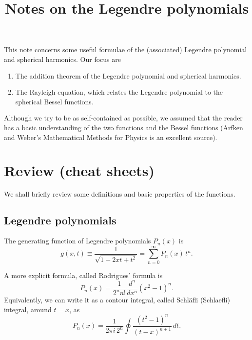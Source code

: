 \documentclass[11pt]{article}
\begin{document}
\title{Notes on the Legendre polynomials}
\author{ \vspace{-10ex} }
\date{ \vspace{-10ex} }
\maketitle



This note concerns some useful formulae of
the (associated) Legendre polynomial
and spherical harmonics.
%
Our focus are
\begin{enumerate}
  \item The addition theorem of the Legendre polynomial and spherical harmonics.
  \item The Rayleigh equation, which relates the Legendre polynomial
        to the spherical Bessel functions.
\end{enumerate}

Although we try to be as self-contained as possible,
we assumed that the reader
has a basic understanding of the two functions
and the Bessel functions
(Arfken and Weber's Mathematical Methods for Physics\cite{arfken}
is an excellent source).






\section{Review (cheat sheets)}



We shall briefly review some definitions and basic properties of the functions.



\subsection{Legendre polynomials}



The generating function of Legendre polynomials $P_n(x)$ is
%
\begin{equation}
  g(x, t)
\equiv
  \frac{ 1 }
  { \sqrt{1 - 2 x t + t^2} }
=
  \sum_{n = 0}^\infty P_n(x) \, t^n.
  \label{eq:legendre_gf}
\end{equation}

A more explicit formula, called Rodrigues' formula is
%
\begin{equation}
  P_n(x)
=
  \frac{1}{2^n n!}
  \frac{d^n}{dx^n}
  (x^2 - 1)^n.
  \label{eq:legendre_rodrigues}
\end{equation}
%
Equivalently, we can write it as a contour integral,
called Schl\"{a}fli (Schlaefli) integral, around $t = x$, as
\begin{equation}
  P_n(x)
=
  \frac{1}{2\pi i \, 2^n}
  \oint
  \frac{ (t^2 - 1)^n } { (t - x)^{n+1} } \, dt.
  \label{eq:legendre_schlaefli}
\end{equation}
\end{document}
